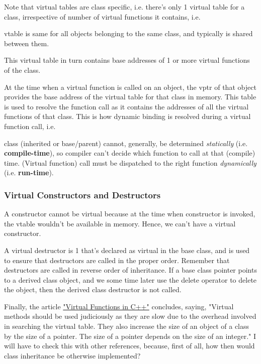 \documentclass[10pt]{amsart}
\begin{document}
\begin{multicols*}{2}
Note that virtual tables are class specific, i.e. there's only 1 virtual table for a class, irrespective of number of virtual functions it contains, i.e.  

vtable is same for all objects belonging to the same class, and typically is shared between them.    
  

This virtual table in turn contains base addresses of 1 or more virtual functions of the class.  

At the time when a virtual function is called on an object, the vptr of that object provides the base address of the virtual table for that class in memory.  This table is used to resolve the function call as it contains the addresses of all the virtual functions of that class.  This is how dynamic binding is resolved during a virtual function call, i.e.  

class (inherited or base/parent) cannot, generally, be determined \emph{statically} (i.e. \textbf{compile-time}), so compiler can't decide which function to call at that (compile) time.  (Virtual function) call must be dispatched to the right function \emph{dynamically} (i.e. \textbf{run-time}).  

  

\subsubsection{Virtual Constructors and Destructors}  

A constructor cannot be virtual because at the time when constructor is invoked, the vtable wouldn't be available in memory.  Hence, we can't have a virtual constructor.  

A virtual destructor is 1 that's declared as virtual in the base class, and is used to ensure that destructors are called in the proper order.  Remember that destructors are called in reverse order of inheritance.  If a base class pointer points to a derived class object, and we some time later use the delete operator to delete the object, then the derived class destructor is not called.  

Finally, the article \href{http://wayback.archive.org/web/20100209040010/http://www.codersource.net/published/view/325/virtual_functions_in.aspx}{"Virtual Functions in C++"} concludes, saying, "Virtual methods should be used judiciously as they are slow due to the overhead involved in searching the virtual table. They also increase the size of an object of a class by the size of a pointer. The size of a pointer depends on the size of an integer."  I will have to check this with other references, because, first of all, how then would class inheritance be otherwise implemented?  


\end{multicols*}
\end{document}
